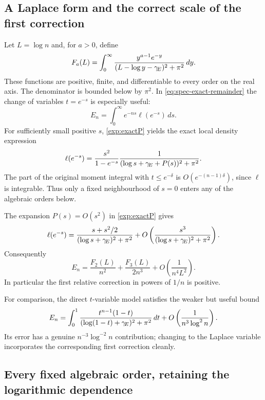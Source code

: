 \subsection{A Laplace form and the correct scale of the first correction}

Let $L=\log n$ and, for $a>0$, define
\begin{equation}\label{exp:Fa}
 F_a(L)=\int_0^\infty
     \frac{y^{a-1}e^{-y}}
      {(L-\log y-\gamma_{\!E})^2+\pi^2}\,dy.
\end{equation}
These functions are positive, finite, and differentiable to every order on
the real axis. The denominator is bounded below by $\pi^2$.
In \eqref{eq:spec-exact-remainder} the change of variables $t=e^{-s}$ is especially useful:
\[
 E_n=\int_0^\infty e^{-ns}\ell(e^{-s})\,ds.
\]
For sufficiently small positive $s$, \eqref{exp:exactP} yields the exact
local density expression
\begin{equation}\label{exp:laplacedensity}
 \ell(e^{-s})
 =\frac{s^2}{1-e^{-s}}
     \frac1{(\log s+\gamma_{\!E}+P(s))^2+\pi^2}.
\end{equation}
The part of the original moment integral with $t\leq e^{-\delta}$ is
$O(e^{-(n-1)\delta})$, since $\ell$ is integrable. Thus only a fixed
neighbourhood of $s=0$ enters any of the algebraic orders below.

The expansion $P(s)=O(s^2)$ in \eqref{exp:exactP} gives
\[
 \ell(e^{-s})
 =\frac{s+s^2/2}{(\log s+\gamma_{\!E})^2+\pi^2}
  +O\left(\frac{s^3}{(\log s+\gamma_{\!E})^2+\pi^2}\right).
\]
Consequently
\begin{equation}\label{exp:twosectors}
 E_n=\frac{F_2(L)}{n^2}+\frac{F_3(L)}{2n^3}
           +O\left(\frac1{n^4L^2}\right).
\end{equation}
In particular the first relative correction in powers of $1/n$ is positive.

For comparison, the direct $t$-variable model satisfies the weaker but useful
bound
\[
 E_n=\int_0^1\frac{t^{n-1}(1-t)}
       {(\log(1-t)+\gamma_{\!E})^2+\pi^2}\,dt
         +O\left(\frac1{n^3\log^2n}\right).
\]
Its error has a genuine $n^{-3}\log^{-2}n$ contribution; changing to the
Laplace variable incorporates the corresponding first correction cleanly.

\subsection{Every fixed algebraic order, retaining the logarithmic dependence}

